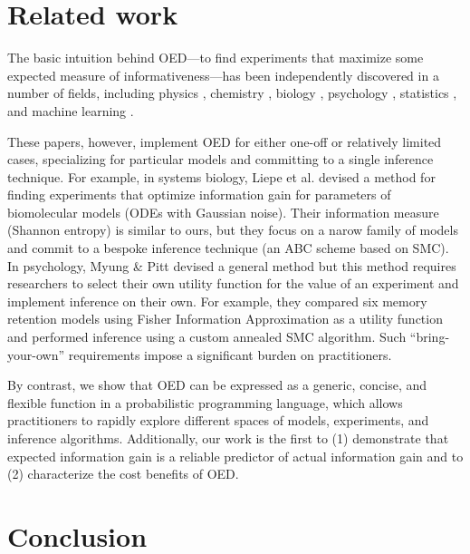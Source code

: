 \documentclass{article}
\begin{document}

\section{Related work}

The basic intuition behind OED---to find experiments that maximize some expected measure of informativeness---has been independently discovered in a number of fields, including physics \cite{vanDenBerg2003}, chemistry \cite{Huan2010}, biology \cite{Vanlier2012, Liepe2013}, psychology \cite{Myung2009}, statistics \cite{Lindley1956}, and machine learning \cite{Golovin2010}.

These papers, however, implement OED for either one-off or relatively limited cases, specializing for  particular models and committing to a single inference technique.
For example, in systems biology, Liepe et al. \cite{Liepe2013} devised a method for finding experiments that optimize information gain for parameters of biomolecular models (ODEs with Gaussian noise).
Their information measure (Shannon entropy) is similar to ours, but they focus on a narow family of models and commit to a bespoke inference technique (an ABC scheme based on SMC).
In psychology, Myung \& Pitt \cite{Myung2009} devised a general method but this method requires researchers to select their own utility function for the value of an experiment and implement inference on their own.
For example, they compared six memory retention models using Fisher Information Approximation as a utility function and performed inference using a custom annealed SMC algorithm.
Such ``bring-your-own'' requirements impose a significant burden on practitioners.

By contrast, we show that OED can be expressed as a generic, concise, and flexible function in a probabilistic programming language, which allows practitioners to rapidly explore different spaces of models, experiments, and inference algorithms.
Additionally, our work is the first to (1) demonstrate that expected information gain is a reliable predictor of actual information gain and to (2) characterize the cost benefits of OED.

\section{Conclusion}
\end{document}
